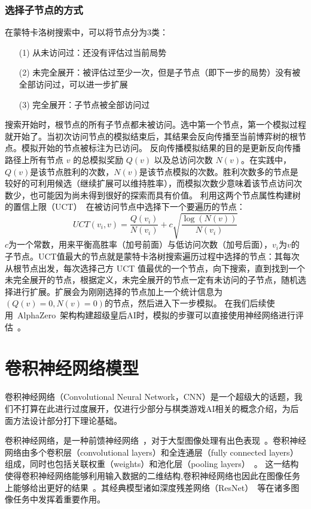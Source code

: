 \subsubsection{选择子节点的方式}
在蒙特卡洛树搜索中，可以将节点分为3类：

\begin{itemize}
    \item [(1)] 
    从未访问过：还没有评估过当前局势
    \item [(2)]
    未完全展开：被评估过至少一次，但是子节点（即下一步的局势）没有被全部访问过，可以进一步扩展
    \item [(3)]
    完全展开：子节点被全部访问过
\end{itemize}

搜索开始时，根节点的所有子节点都未被访问。选中第一个节点，第一个模拟过程就开始了。当初次访问节点的模拟结束后，其结果会反向传播至当前博弈树的根节点。模拟开始的节点被标注为已访问。
反向传播模拟结果的目的是更新反向传播路径上所有节点 $v$ 的总模拟奖励 $Q(v)$ 以及总访问次数 $N(v)$。在实践中，$Q(v)$是该节点胜利的次数，$N(v)$是该节点模拟的次数。胜利次数多的节点是较好的可利用候选（继续扩展可以维持胜率），而模拟次数少意味着该节点访问次数少，也可能因为尚未得到很好的探索而具有价值。
利用这两个节点属性构建树的置信上限（UCT）~\cite{10.1007/11871842_29}在被访问节点中选择下一个要遍历的节点：
\begin{equation*}
    UCT(v_{i},v) = \frac{Q(v_{i})}{N(v_{i})} + c\sqrt{\frac{\log(N(v))}{N(v_{i})}}
\end{equation*}
$c$为一个常数，用来平衡高胜率（加号前面）与低访问次数（加号后面），$v_{i}$为$v$的子节点。UCT值最大的节点就是蒙特卡洛树搜索遍历过程中选择的节点：其每次从根节点出发，每次选择己方 UCT 值最优的一个节点，向下搜索，直到找到一个未完全展开的节点，根据定义，未完全展开的节点一定有未访问的子节点，随机选择进行扩展。扩展会为刚刚选择的节点加上一个统计信息为$(Q(v)=0,N(v)=0)$的节点，然后进入下一步模拟。
在我们后续使用~AlphaZero~架构构建超级皇后AI时，模拟的步骤可以直接使用神经网络进行评估~\cite{Silver1140,Silver2017,Silver2016}。

\section{卷积神经网络模型}
卷积神经网络（Convolutional Neural Network，CNN）是一个超级大的话题，我们不打算在此进行过度展开，仅进行少部分与棋类游戏AI相关的概念介绍，为后面方法设计部分打下理论基础。

卷积神经网络，是一种前馈神经网络~\cite{SCHMIDHUBER201585}，对于大型图像处理有出色表现~\cite{NIPS2012_4824}。卷积神经网络由多个卷积层（convolutional layers）和全连通层（fully connected layers）组成，同时也包括关联权重（weights）和池化层（pooling layers）~\cite{venkatesan2017convolutional}。
这一结构使得卷积神经网络能够利用输入数据的二维结构,卷积神经网络也因此在图像任务上能够给出更好的结果~\cite{VALUEVA2020232}。其经典模型诸如深度残差网络（ResNet）~\cite{resnet}等在诸多图像任务中发挥着重要作用。


